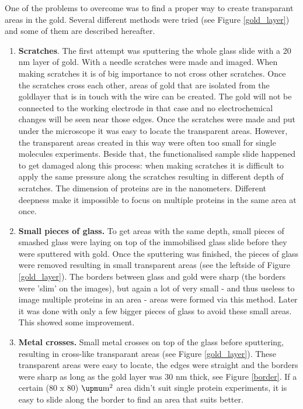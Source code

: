 \documentclass[twoside,single]{lion-msc}
\begin{document}
One of the problems to overcome was to find a proper way to create transparant areas in the gold. Several different methods were tried (see Figure \ref{gold_layer}) and some of them are described hereafter.
\begin{enumerate}
\item \textbf{Scratches}.  The first attempt was sputtering the whole glass slide with a 20 nm layer of gold. With a needle scratches were made and imaged. When making scratches it is of big importance to not cross other scratches. Once the scratches cross each other, areas of gold that are isolated from the goldlayer that is in touch with the wire can be created. The gold will not be connected to the working electrode in that case and no electrochemical changes will be seen near those edges. Once the scratches were made and put under the microscope it was easy to locate the transparent areas. However, the transparent areas created in this way were often too small for single molecules experiments. Beside that, the functionalised sample slide happened to get damaged along this process: when making scratches it is difficult to apply the same pressure along the scratches resulting in different depth of scratches. The dimension of proteins are in the nanometers. Different deepness make it impossible to focus on multiple proteins in the same area at once.
\item \textbf{Small pieces of glass.} To get areas with the same depth, small pieces of smashed glass were laying on top of the immobilised glass slide before they were sputtered with gold. Once the sputtering was finished, the pieces of glass were removed resulting in small transparent areas (see the leftside of Figure \ref{gold_layer}). The borders between glass and gold were sharp (the borders were 'slim' on the images), but again a lot of very small - and thus useless to image multiple proteins in an area - areas were formed via this method. Later it was done with only a few bigger pieces of glass to avoid these small areas. This showed some improvement. 
\item \textbf{Metal crosses.} Small metal crosses on top of the glass before sputtering, resulting in cross-like transparant areas (see Figure \ref{gold_layer}). These transparent areas were easy to locate, the edges were straight and the borders were sharp as long as the gold layer was 30 nm thick, see Figure \ref{border}. If a certain (80 x 80) $\upmu \textup{m}^{2}$ area didn't suit single protein experiments, it is easy to slide along the border to find an area that suits better. 
\end{enumerate}
\end{document}
